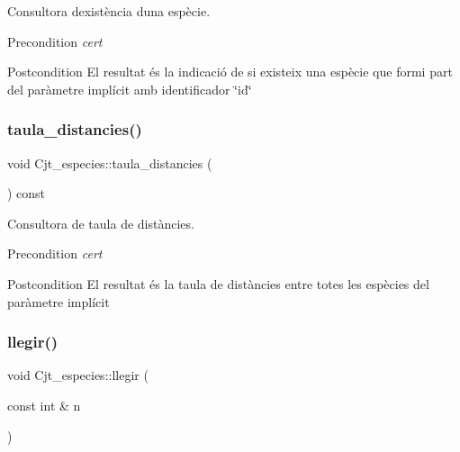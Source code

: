 Consultora d\textquotesingle{}existència d\textquotesingle{}una espècie. 

\begin{DoxyPrecond}{Precondition}
{\itshape cert} 
\end{DoxyPrecond}
\begin{DoxyPostcond}{Postcondition}
El resultat és la indicació de si existeix una espècie que formi part del paràmetre implícit amb identificador \char`\"{}id\char`\"{} 
\end{DoxyPostcond}
\mbox{\label{class_cjt__especies_ad66ac0438cce1ecf2c5553cb98f1085a}} 
\subsubsection{\texorpdfstring{taula\+\_\+distancies()}{taula\_distancies()}}
{\footnotesize\ttfamily void Cjt\+\_\+especies\+::taula\+\_\+distancies (\begin{DoxyParamCaption}{ }\end{DoxyParamCaption}) const}



Consultora de taula de distàncies. 

\begin{DoxyPrecond}{Precondition}
{\itshape cert} 
\end{DoxyPrecond}
\begin{DoxyPostcond}{Postcondition}
El resultat és la taula de distàncies entre totes les espècies del paràmetre implícit 
\end{DoxyPostcond}
\mbox{\label{class_cjt__especies_a4d0f724a9540f96244f86913f916650c}} 
\subsubsection{\texorpdfstring{llegir()}{llegir()}}
{\footnotesize\ttfamily void Cjt\+\_\+especies\+::llegir (\begin{DoxyParamCaption}\item[{const int \&}]{n }\end{DoxyParamCaption})}



